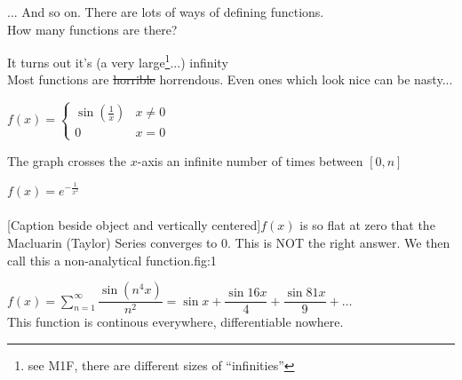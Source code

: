 ... And so on. There are lots of ways of defining functions. \\

How many functions are there? 

It turns out it's (a very large\footnote{see M1F, there are different sizes of ``infinities''}...) infinity\\

Most functions are \sout{horrible} horrendous.
Even ones which look nice can be nasty...\\

\begin{example} $f(x) = \begin{cases}
 \sin(\frac{1}{x}) & x \neq 0\\
 0 & x = 0
 \end{cases}$\\
 
 \end{example}

The graph crosses the $x$-axis an infinite number of times between $[0,n]$\\


\pagebreak

\begin{example} $f(x) = e^{-\frac{1}{x^2}}$\\\\

%
[Caption beside object and vertically centered]{$f(x)$ is so flat at zero that the Macluarin (Taylor) Series converges to 0. This is NOT the right answer. We then call this a non-analytical function.}{fig:1}
\end{example}

\begin{example} $f(x) = \displaystyle{\sum_{n=1}^{\infty} } \dfrac{\sin (n^4x)}{n^2} = \sin x + \dfrac{\sin 16x}{4} + \dfrac{\sin 81x}{9} + \dots$\\

This function is continous everywhere, differentiable nowhere.\\
\end{example}



